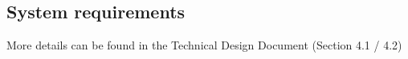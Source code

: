 \subsection{System requirements}
More details can be found in the Technical Design Document (Section 4.1 / 4.2)

\clearpage